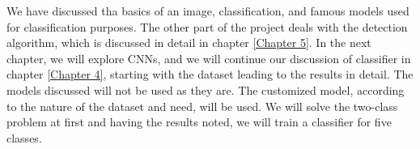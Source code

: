 We have discussed tha basics of an image, classification, and famous models used
for classification purposes. The other part of the project deals with
the detection algorithm, which is discussed in detail in chapter \ref{Chapter 5}.
In the next chapter, we will explore CNNs, and we will continue our discussion
of classifier in chapter \ref{Chapter 4}, starting with the dataset leading to the
results in detail. The models discussed will not be used as they are. 
The customized model, according to the nature of the dataset and need, will be used.
We will solve the two-class problem at first and having the results noted, 
we will train a classifier for five classes.

